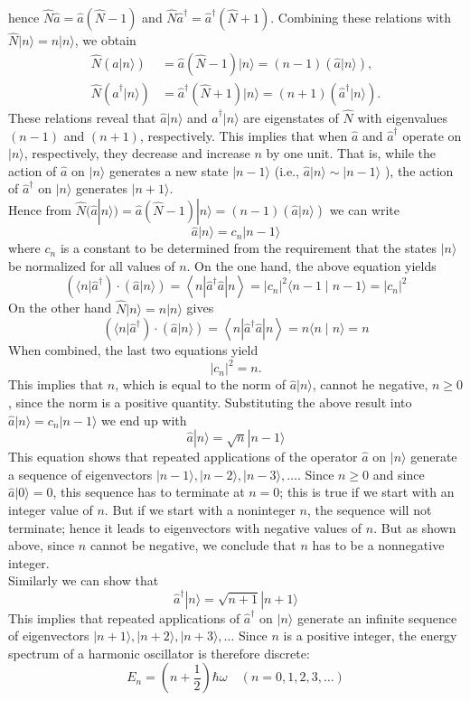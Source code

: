 hence $\hat{N} \hat{a}=\hat{a}(\hat{N}-1)$ and $\hat{N} \hat{a}^{\dagger}=\hat{a}^{\dagger}(\hat{N}+1) .$ Combining these relations with $
\hat{N}|n\rangle=n|n\rangle
$, we obtain \\
$$\begin{aligned}
	\hat{N}(\hat{a}|n\rangle) &=\hat{a}(\hat{N}-1)|n\rangle=(n-1)(\hat{a}|n\rangle), \\
	\hat{N}\left(\hat{a}^{\dagger}|n\rangle\right) &=\hat{a}^{\dagger}(\hat{N}+1)|n\rangle=(n+1)\left(\hat{a}^{\dagger}|n\rangle\right) .
\end{aligned}$$
These relations reveal that $\hat{a}|n\rangle$ and $\hat{a}^{\dagger}|n\rangle$ are eigenstates of $\hat{N}$ with eigenvalues $(n-1)$ and $(n+1)$, respectively. This implies that when $\hat{a}$ and $\hat{a}^{\dagger}$ operate on $|n\rangle$, respectively, they decrease and increase $n$ by one unit. That is, while the action of $\hat{a}$ on $|n\rangle$ generates a new state $|n-1\rangle$ (i.e., $\hat{a}|n\rangle \sim|n-1\rangle$ ), the action of $\hat{a}^{\dagger}$ on $|n\rangle$ generates $|n+1\rangle$.\\
 Hence from $\hat{N}(\hat{a}|n\rangle) =\hat{a}(\hat{N}-1)|n\rangle=(n-1)(\hat{a}|n\rangle)$ we can write
 $$\hat{a}|n\rangle=c_{n}|n-1\rangle$$
 where $c_{n}$ is a constant to be determined from the requirement that the states $|n\rangle$ be normalized for all values of $n$. On the one hand, the above equation  yields
 $$\left(\langle n| \hat{a}^{\dagger}\right) \cdot(\hat{a}|n\rangle)=\left\langle n\left|\hat{a}^{\dagger} \hat{a}\right| n\right\rangle=\left|c_{n}\right|^{2}\langle n-1 \mid n-1\rangle=\left|c_{n}\right|^{2}$$
 On the other hand $\hat{N}|n\rangle=n|n\rangle $ gives
 $$\left(\langle n| \hat{a}^{\dagger}\right) \cdot(\hat{a}|n\rangle)=\left\langle n\left|\hat{a}^{\dagger} \hat{a}\right| n\right\rangle=n\langle n \mid n\rangle=n $$
 When combined, the last two equations yield
 $$
 \left|c_{n}\right|^{2}=n .
 $$
 This implies that $n$, which is equal to the norm of $\hat{a}|n\rangle$, cannot he negative, $n \geq 0$, since the norm is a positive quantity. Substituting the above result  into $\hat{a}|n\rangle=c_{n}|n-1\rangle$  we end up with
 $$\hat{a}|n\rangle=\sqrt{n}|n-1\rangle$$
 This equation shows that repeated applications of the operator $\hat{a}$ on $|n\rangle$ generate a sequence of eigenvectors $|n-1\rangle,|n-2\rangle,|n-3\rangle, \ldots$. Since $n \geq 0$ and since $\hat{a}|0\rangle=0$, this sequence has to terminate at $n=0$; this is true if we start with an integer value of $n$. But if we start with a noninteger $n$, the sequence will not terminate; hence it leads to eigenvectors with negative values of $n$. But as shown above, since $n$ cannot be negative, we conclude that $n$ has to be a nonnegative integer.\\
 Similarly we can show that \\
 $$\hat{a}^{\dagger}|n\rangle=\sqrt{n+1}|n+1\rangle$$
 This implies that repeated applications of $\hat{a}^{\dagger}$ on $|n\rangle$ generate an infinite sequence of eigenvectors $|n+1\rangle,|n+2\rangle,|n+3\rangle, \ldots$ Since $n$ is a positive integer, the energy spectrum of a harmonic oscillator  is therefore discrete:
$$ E_{n}=\left(n+\frac{1}{2}\right) \hbar \omega \quad(n=0,1,2,3, \ldots)$$
